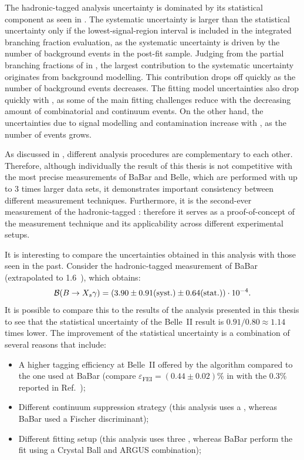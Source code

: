 The hadronic-tagged \BtoXsgamma analysis uncertainty is dominated by its statistical component as seen in .
The systematic uncertainty is larger than the statistical uncertainty only if the lowest-\EB signal-region interval is included in the integrated branching fraction evaluation, 
as the systematic uncertainty is driven by the number of background events in the post-fit sample.
Judging from the partial branching fractions of \BtoXsgamma in ,
the largest contribution to the systematic uncertainty originates from background modelling.
This contribution drops off quickly as the number of background events decreases.
The \Mbc fitting model uncertainties also drop quickly with \EB, as some of the main fitting challenges reduce with the decreasing amount of combinatorial \BB and continuum events.
On the other hand, the uncertainties due to signal modelling and \BtoXdgamma contamination increase with \EB, as the number of \BtoXsdgamma events grows.

As discussed in , different analysis procedures are complementary to each other.
Therefore, although individually the result of this thesis is not competitive with the most precise measurements of BaBar and Belle, which are performed with up to 3 times larger data sets,
it demonstrates important consistency between different measurement techniques.
Furthermore, it is the second-ever measurement of the hadronic-tagged \BtoXsgamma: therefore it serves as a proof-of-concept of the measurement technique and its applicability across different experimental setups.

It is interesting to compare the uncertainties obtained in this analysis with those seen in the past.
Consider the hadronic-tagged measurement of BaBar \cite{BaBar:2007yhb} (extrapolated to 1.6~\gev), which obtains:
\begin{equation}\label{eq:babar_measurement}
    \mathcal{B}(\BtoXsgamma) = (3.90 \pm 0.91 \mathrm{(syst.)} \pm 0.64 \mathrm{(stat.)}) \cdot 10^{-4}.
\end{equation}
It is possible to compare this to the results of the analysis presented in this thesis
to see that the statistical uncertainty of the Belle~II result is $0.91/0.80\approx1.14$ times lower.
The improvement of the statistical uncertainty is a combination of several reasons that include:
\begin{itemize}
    \item A higher tagging efficiency at Belle~II offered by the \FEI algorithm compared to the one used at BaBar (compare $\varepsilon_{\mathrm{FEI}} = (0.44\pm0.02)\%$ in  with the 0.3\% reported in Ref.~\cite{BaBar:2007yhb});
    \item Different continuum suppression strategy (this analysis uses a \BDT, whereas BaBar used a Fischer discriminant);
    \item Different fitting setup (this analysis uses three , whereas BaBar perform the fit using a Crystal Ball and ARGUS \PDF combination);
\end{itemize}

